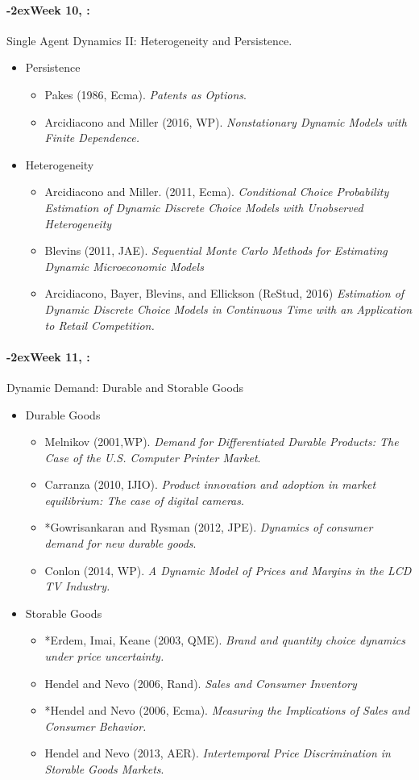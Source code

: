 \documentclass[11pt]{article}
\newcommand{\week}[1]{%
  \paragraph*{\kern-2ex\quad #1, \syldate{\today}:}%
  \AdvanceDate[7]%
}
\begin{document}
\week{Week 10} Single Agent Dynamics II: Heterogeneity and Persistence. 
\begin{itemize}
\item Persistence
\begin{itemize}
\item Pakes (1986, Ecma). \textit{Patents as Options}.
\item Arcidiacono and Miller (2016, WP). \textit{Nonstationary Dynamic Models with Finite Dependence.}
\end{itemize}
\item Heterogeneity
\begin{itemize}
\item Arcidiacono and Miller. (2011, Ecma). \textit{Conditional Choice Probability Estimation of Dynamic Discrete Choice Models with Unobserved Heterogeneity}
\item Blevins (2011, JAE). \textit{Sequential Monte Carlo Methods for Estimating Dynamic Microeconomic Models}
\item Arcidiacono, Bayer, Blevins, and Ellickson (ReStud, 2016) \textit{Estimation of Dynamic Discrete Choice Models in Continuous Time with an Application to Retail Competition.}
\end{itemize}
\end{itemize}

\week{Week 11}  Dynamic Demand: Durable and Storable Goods
\begin{itemize}
\item Durable Goods
\begin{itemize}
\item Melnikov (2001,WP). \textit{Demand for Differentiated Durable Products: The Case of the U.S. Computer Printer Market}.
\item Carranza (2010, IJIO). \textit{Product innovation and adoption in market equilibrium: The case of digital cameras}.
\item *Gowrisankaran and Rysman (2012, JPE). \textit{Dynamics of consumer demand for new durable goods}.
\item Conlon (2014, WP). \textit{A Dynamic Model of Prices and Margins in the LCD TV Industry.}
\end{itemize}
\item Storable Goods
\begin{itemize}
\item *Erdem, Imai, Keane (2003, QME). \textit{Brand and quantity choice dynamics under price uncertainty.}
\item Hendel and Nevo (2006, Rand). \textit{Sales and Consumer Inventory}
\item *Hendel and Nevo (2006, Ecma). \textit{Measuring the Implications of Sales and Consumer Behavior.}
\item Hendel and Nevo (2013, AER). \textit{Intertemporal Price Discrimination in Storable Goods Markets}.
\end{itemize}
\end{itemize}
\end{document}
